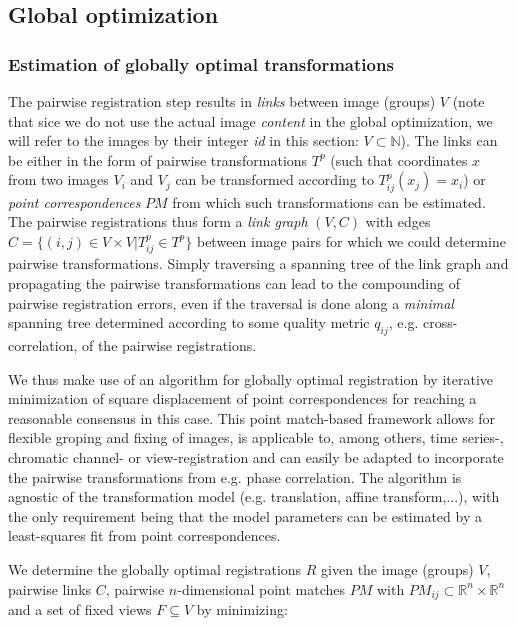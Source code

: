 \subsection{Global optimization}

\subsubsection{Estimation of globally optimal transformations}

The pairwise registration step results in \emph{links} between image (groups) $V$ (note that sice we do not use the actual image \emph{content} in the global optimization, we will refer to the images by their integer \emph{id} in this section: $V \subset \mathbb{N}$). The links can be either in the form of pairwise transformations $T^{p}$  (such that coordinates $x$ from two images $V_i$ and $V_j$ can be transformed according to $T^p_{ij} (x_{j}) = x_i$) or \emph{point correspondences} $PM$ from which such transformations can be estimated.
The pairwise registrations thus form a \emph{link graph} $(V, C)$ with edges $C = \{(i,j) \in V \times V | T^p_{ij} \in T^p \}$ between image pairs for which we could determine pairwise transformations. Simply traversing a spanning tree of the link graph and propagating the pairwise transformations can lead to the compounding of pairwise registration errors, even if the traversal is done along a \emph{minimal} spanning tree determined according to some quality metric $q_{ij}$, e.g. cross-correlation, of the pairwise registrations.

We thus make use of an algorithm for globally optimal registration by iterative minimization of square displacement of point correspondences\cite{saalfeld2010rigid} for reaching a reasonable consensus in this case. This point match-based framework allows for flexible groping and fixing of images, is applicable to, among others, time series-, chromatic channel- or view-registration and can easily be adapted to incorporate the pairwise transformations from e.g. phase correlation. The algorithm is agnostic of the transformation model (e.g. translation, affine transform,...), with the only requirement being that the model parameters can be estimated by a least-squares fit from point correspondences.

We determine the globally optimal registrations $R$ given the image (groups) $V$, pairwise links $C$, pairwise $n$-dimensional point matches $PM$ with $PM_{ij} \subset \mathbb{R}^n \times  \mathbb{R}^n$ and a set of fixed views $F \subseteq V$ by minimizing:

